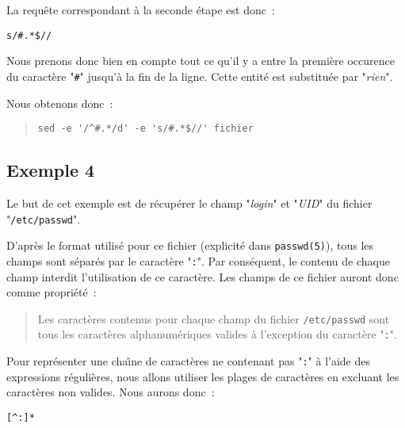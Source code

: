 La requ{\^e}te correspondant {\`a} la seconde {\'e}tape est donc~:
\begin{center}
\verb=s/#.*$//=
\end{center}
Nous prenons donc bien en compte tout ce qu'il y a entre la premi{\`e}re occurence
du caract{\`e}re "\verb=#=" jusqu'{\`a} la fin de la ligne. Cette entit{\'e} est
substitu{\'e}e par "{\sl rien}".

Nous obtenons donc~:
\begin{quote}
\begin{verbatim}
sed -e '/^#.*/d' -e 's/#.*$//' fichier
\end{verbatim}
\end{quote}

\subsection{\label{adv-fltrs-sed-ex4}Exemple 4}

Le but de cet exemple est de r{\'e}cup{\'e}rer le champ "{\sl login}" et "{\sl UID}"
du fichier "{\tt /etc/passwd}".

D'apr{\`e}s le format utilis{\'e} pour ce fichier (explicit{\'e} dans {\tt passwd(5)}), tous
les champs sont s{\'e}par{\'e}s par le caract{\`e}re "{\tt :}". Par cons{\'e}quent,
le contenu de chaque champ interdit l'utilisation de ce caract{\`e}re. Les champs
de ce fichier auront donc comme propri{\'e}t{\'e}~:
\begin{quote}
Les caract{\`e}res contenus pour chaque champ du fichier {\tt /etc/passwd} sont
tous les caract{\`e}res alphanum{\'e}riques valides {\`a} l'exception du caract{\`e}re
"{\tt :}".
\end{quote}
Pour repr{\'e}senter une cha{\^\i}ne de caract{\`e}res ne contenant pas "{\tt :}" {\`a}
l'aide des expressions r{\'e}guli{\`e}res, nous allons utiliser les plages de caract{\`e}res
en excluant les caract{\`e}res non valides. Nous aurons donc~:
\begin{center}
\verb=[^:]*=\\[1ex]
\end{center}

